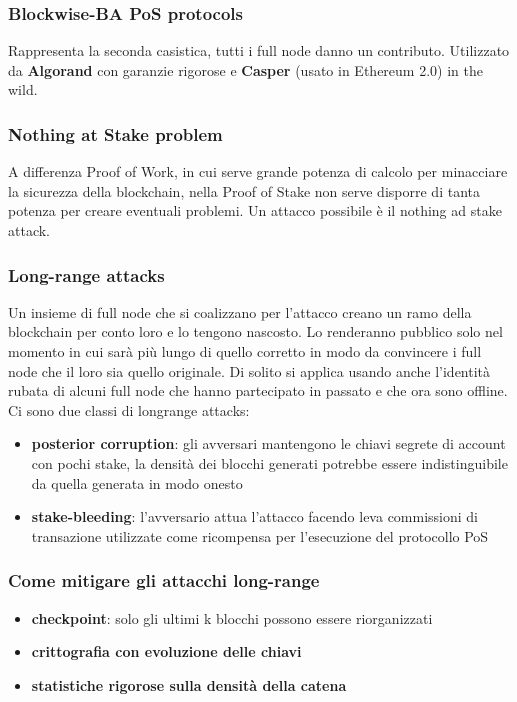 \subsubsection{Blockwise-BA PoS protocols}
Rappresenta la seconda casistica, tutti i full node danno un contributo. Utilizzato da \textbf{Algorand} con garanzie rigorose e \textbf{Casper} (usato in Ethereum 2.0) in the wild.

\subsubsection{Nothing at Stake problem}
A differenza Proof of Work, in cui serve grande potenza di calcolo per minacciare la sicurezza della blockchain, nella Proof of Stake non serve disporre di tanta potenza per creare eventuali problemi.
Un attacco possibile è il nothing ad stake attack. 


\subsubsection{Long-range attacks}
Un insieme di full node che si coalizzano per l'attacco creano un ramo della blockchain per conto loro e lo tengono nascosto. Lo renderanno pubblico solo nel momento in cui sarà più lungo di quello corretto in modo da convincere i full node che il loro sia quello originale. Di solito si applica usando anche l'identità rubata di alcuni full node che hanno partecipato in passato e che ora sono offline. Ci sono due classi di longrange attacks:
\begin{itemize}
    \item \textbf{posterior corruption}: gli avversari mantengono le chiavi segrete di account con pochi stake, la densità dei blocchi generati potrebbe essere indistinguibile da quella generata in modo onesto
    \item \textbf{stake-bleeding}: l'avversario attua l'attacco facendo leva
commissioni di transazione utilizzate come ricompensa per l'esecuzione del protocollo PoS
\end{itemize}

\subsubsection{Come mitigare gli attacchi long-range}
\begin{itemize}
    \item \textbf{checkpoint}: solo gli ultimi k blocchi possono essere riorganizzati
    \item \textbf{crittografia con evoluzione delle chiavi}
    \item \textbf{statistiche rigorose sulla densità della catena}
\end{itemize}



